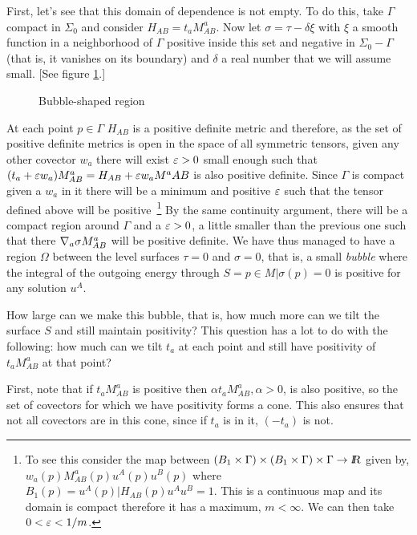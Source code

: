 First, let's see that this domain of dependence is not empty. To do this, take $\Gamma$ compact in $\Sigma_0$ and consider $H_{AB} = t_aM^a_{AB}$. Now let $\sigma = \tau - \delta \xi$ with $\xi$ a smooth function in a neighborhood of $\Gamma$ positive inside this set and negative in $\Sigma_0 - \Gamma$ (that is, it vanishes on its boundary) and $\delta$ a real number that we will assume small. 
[See figure \ref{fig:13_6c}.]

\espa 
\begin{figure}[htbp] 
    \begin{center}  
        \caption{Bubble-shaped region} 
        \label{fig:13_6c} 
    \end{center}
\end{figure}

At each point $p \in \Gamma$ $H_{AB}$ is a positive definite metric and therefore, as the set of positive definite metrics is open in the space of all symmetric tensors, 
given any other covector $w_a$ there will exist $\mbox{$\varepsilon$} > 0$ small enough such that $(t_a + \mbox{$\varepsilon$} w_a)M^a_{AB} = H_{AB} + \mbox{$\varepsilon$} w_aM^a{AB}$ is also positive definite. 
Since $\Gamma$ is compact given a $w_a$ in it there will be a minimum and positive $\mbox{$\varepsilon$}$ such that the tensor defined above will be positive~\footnote{To see this consider the map between 
$(B_1 \times \Gamma) \times (B_1 \times \Gamma) \times \Gamma \to \mbox{\sl {l$\!\!\!\;\:\!$R}}$ given by, $w_a(p)M^a_{AB}(p)u^A(p)u^B(p) $ where $B_1(p) = {u^A(p)|H_{AB}(p)u^Au^B = 1}$. 
This is a continuous map and its domain is compact therefore it has a maximum, $m < \infty$. We can then take $0 < \mbox{$\varepsilon$} < 1/m$.} 
By the same continuity argument, there will be a compact region around $\Gamma$ and a $\mbox{$\varepsilon$} > 0$, a little smaller than the previous one such that there $\nabla_a\sigma M^a_{AB}$ will be positive definite. We have thus managed to have a region $\Omega$ between the level surfaces $\tau = 0$ and $\sigma = 0$, that is, a small {\sl bubble} where the integral of the outgoing energy through $S = {p\in M|\sigma(p) = 0}$ is positive for any solution $u^A$.

How large can we make this bubble, that is, how much more can we tilt the surface $S$ and still maintain positivity? 
This question has a lot to do with the following: how much can we tilt $t_a$ at each point and still have positivity of 
$t_aM^a_{AB}$ at that point?

First, note that if $t_aM^a_{AB}$ is positive then $\alpha t_aM^a_{AB}, \alpha >0 $, is also positive, so the set of covectors for which we have positivity forms a cone. This also ensures that not all covectors are in this cone, since if $t_a$ is in it, $(-t_a)$ is not.

